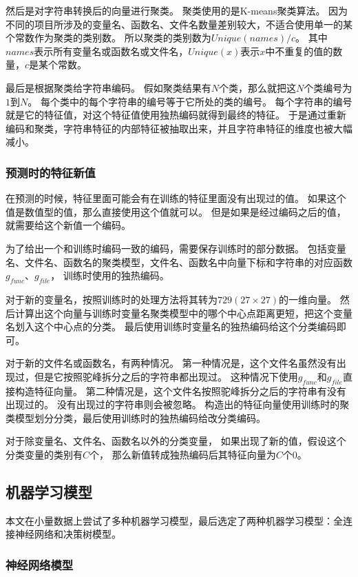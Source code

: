 然后是对字符串转换后的向量进行聚类。
聚类使用的是K-means聚类算法。
因为不同的项目所涉及的变量名、函数名、文件名数量差别较大，不适合使用单一的某个常数作为聚类的类别数。
所以聚类的类别数为$Unique(names) / c$。
其中$names$表示所有变量名或函数名或文件名，$Unique(x)$表示$x$中不重复的值的数量，$c$是某个常数。

最后是根据聚类给字符串编码。
假如聚类结果有$N$个类，那么就把这$N$个类编号为$1$到$N$。
每个类中的每个字符串的编号等于它所处的类的编号。
每个字符串的编号就是它的特征值，对这个特征值使用独热编码就得到最终的特征。
于是通过重新编码和聚类，字符串特征的内部特征被抽取出来，并且字符串特征的维度也被大幅减小。

\subsubsection{预测时的特征新值}

在预测的时候，特征里面可能会有在训练的特征里面没有出现过的值。
如果这个值是数值型的值，那么直接使用这个值就可以。
但是如果是经过编码之后的值，就需要给这个新值一个编码。

为了给出一个和训练时编码一致的编码，需要保存训练时的部分数据。
包括变量名、文件名、函数名的聚类模型，文件名、函数名中向量下标和字符串的对应函数$g_{func}$、$g_{file}$，
训练时使用的独热编码。

对于新的变量名，按照训练时的处理方法将其转为$729 (27 \times 27)$的一维向量。
然后计算出这个向量与训练时变量名聚类模型中的哪个中心点距离更短，把这个变量名划入这个中心点的分类。
最后使用训练时变量名的独热编码给这个分类编码即可。

对于新的文件名或函数名，有两种情况。
第一种情况是，这个文件名虽然没有出现过，但是它按照驼峰拆分之后的字符串都出现过。
这种情况下使用$g_{func}$和$g_{file}$直接构造特征向量。
第二种情况是，这个文件名按照驼峰拆分之后的字符串有没有出现过的。
没有出现过的字符串则会被忽略。
构造出的特征向量使用训练时的聚类模型划分分类，最后使用训练时的独热编码给改分类编码。

对于除变量名、文件名、函数名以外的分类变量，
如果出现了新的值，假设这个分类变量的类别有$C$个，
那么新值转成独热编码后其特征向量为$C$个0。

\subsection{机器学习模型}

本文在小量数据上尝试了多种机器学习模型，最后选定了两种机器学习模型：全连接神经网络和决策树模型。

\subsubsection{神经网络模型}

